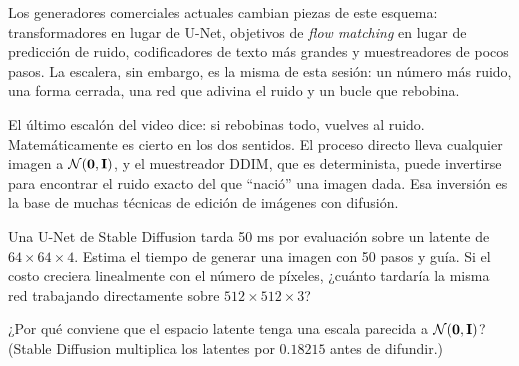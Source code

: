 \documentclass[11pt,letterpaper,oneside]{report}
\newcommand{\Ib}{\mathbf{I}}
\begin{document}
Los generadores comerciales actuales cambian piezas de este esquema: transformadores en lugar de U-Net, objetivos de \emph{flow matching} en lugar de predicción de ruido, codificadores de texto más grandes y muestreadores de pocos pasos. La escalera, sin embargo, es la misma de esta sesión: un número más ruido, una forma cerrada, una red que adivina el ruido y un bucle que rebobina.

\begin{nota}[Rebobinar]
El último escalón del video dice: si rebobinas todo, vuelves al ruido. Matemáticamente es cierto en los dos sentidos. El proceso directo lleva cualquier imagen a $\Normal(\mathbf 0,\Ib)$, y el muestreador DDIM, que es determinista, puede invertirse para encontrar el ruido exacto del que ``nació'' una imagen dada. Esa inversión es la base de muchas técnicas de edición de imágenes con difusión.
\end{nota}

\begin{ejercicio}
Una U-Net de Stable Diffusion tarda 50 ms por evaluación sobre un latente de $64\times64\times4$. Estima el tiempo de generar una imagen con 50 pasos y guía. Si el costo creciera linealmente con el número de píxeles, ¿cuánto tardaría la misma red trabajando directamente sobre $512\times512\times3$?
\end{ejercicio}

\begin{ejercicio}
¿Por qué conviene que el espacio latente tenga una escala parecida a $\Normal(\mathbf 0,\Ib)$? (Stable Diffusion multiplica los latentes por $0.18215$ antes de difundir.)
\end{ejercicio}
\end{document}

